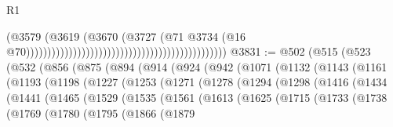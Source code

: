 \begin{lexlean}{R1}
\begin{coremodule}
{{{{{{{{{{{{{{{{{{{{{{{{{{{{{{{{{{{{{{{{{{{{{{{{{{{{{{{{{{{{{{{{{{{{{{{{{{{{{{{{{{{{{{{{{{{{{{{{{{{{{{{{{{{{{{{{{{{{{{{{{{{{{{{{{{{{{{{{{{{{{{{{{{{{{{{{{{{{{{{{{{{{{{{{{{{{{{{{{{{{{{{{{{                                                                                      (@3579
                                                                                        (@3619
                                                                                          (@3670
                                                                                            (@3727
                                                                                              (@71
                                                                                                @3734
                                                                                                (@16
                                                                                                  @70)))))))))))))))))))))))))))))))))))))))))))))))
@3831 := @502
    (@515
      (@523
        (@532
          (@856
            (@875
              (@894
                (@914
                  (@924
                    (@942
                      (@1071
                        (@1132
                          (@1143
                            (@1161
                              (@1193
                                (@1198
                                  (@1227
                                    (@1253
                                      (@1271
                                        (@1278
                                          (@1294
                                            (@1298
                                              (@1416
                                                (@1434
                                                  (@1441
                                                    (@1465
                                                      (@1529
                                                        (@1535
                                                          (@1561
                                                            (@1613
                                                              (@1625
                                                                (@1715
                                                                  (@1733
                                                                    (@1738
                                                                      (@1769
                                                                        (@1780
                                                                          (@1795
                                                                            (@1866
                                                                              (@1879
}}}}}}}}}}}}}}}}}}}}}}}}}}}}}}}}}}}}}}}}}}}}}}}}}}}}}}}}}}}}}}}}}}}}}}}}}}}}}}}}}}}}}}}}}}}}}}}}}}}}}}}}}}}}}}}}}}}}}}}}}}}}}}}}}}}}}}}}}}}}}}}}}}}}}}}}}}}}}}}}}}}}}}}}}}}}}}}}}}}}}}}}}}
\end{coremodule}
\end{lexlean}
